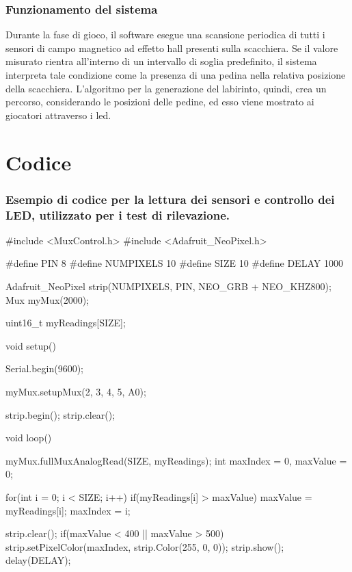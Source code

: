 \documentclass[a4paper,12pt]{article}
\begin{document}
\subsubsection*{Funzionamento del sistema}
Durante la fase di gioco, il software esegue una scansione periodica di tutti i sensori di campo magnetico ad effetto hall presenti sulla scacchiera. Se il valore misurato rientra all’interno di un intervallo di soglia predefinito, il sistema interpreta tale condizione come la presenza di una pedina nella relativa posizione della scacchiera. L’algoritmo per la generazione del labirinto, quindi, crea un percorso, considerando le posizioni delle pedine, ed esso viene mostrato ai giocatori attraverso i led.

\appendix
\newpage

\section{Codice}
\subsubsection*{Esempio di codice per la lettura dei sensori e controllo dei LED, utilizzato per i test di rilevazione.}

\begin{codiceArduino}[]
#include <MuxControl.h>
#include <Adafruit_NeoPixel.h>

#define PIN 8
#define NUMPIXELS 10
#define SIZE 10
#define DELAY 1000

Adafruit_NeoPixel strip(NUMPIXELS, PIN, NEO_GRB + NEO_KHZ800);
Mux myMux(2000);

uint16_t myReadings[SIZE]; 

void setup() {
  Serial.begin(9600);

  myMux.setupMux(2, 3, 4, 5, A0);

  strip.begin();
  strip.clear();
}

void loop() {
  myMux.fullMuxAnalogRead(SIZE, myReadings);
  int maxIndex = 0, maxValue = 0;
  
  for(int i = 0; i < SIZE; i++) {
    if(myReadings[i] > maxValue) {
      maxValue = myReadings[i]; 
      maxIndex = i;
    }
  }
  
  strip.clear();  
  if(maxValue < 400 || maxValue > 500){
    strip.setPixelColor(maxIndex, strip.Color(255, 0, 0));
  }
  strip.show();
  delay(DELAY);
}
\end{codiceArduino}
\end{document}
